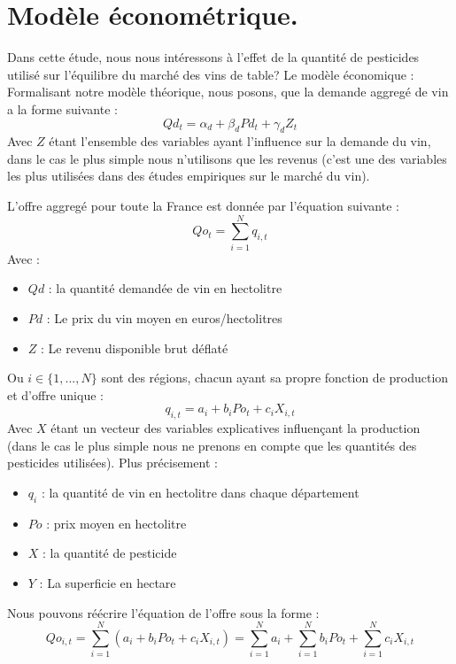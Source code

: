 \documentclass[11pt, a4paper]{article}
\begin{document}
\section*{Modèle économétrique.}
Dans cette étude, nous nous intéressons à l’effet de la quantité de pesticides utilisé sur l’équilibre du marché des vins de table?
Le modèle économique :
Formalisant notre modèle théorique, nous posons, que la demande aggregé de vin a la forme suivante :
\begin{equation}
    Qd_t = \alpha_d + \beta_d Pd_t + \gamma_d Z_t
\end{equation}
Avec $Z$ étant l'ensemble des variables ayant l'influence sur la demande du vin, dans le cas le plus simple nous n'utilisons que les revenus (c'est une des variables les plus utilisées dans des études empiriques sur le marché du vin).
\par
L'offre aggregé pour toute la France est donnée par l'équation suivante : 
\begin{equation}
    Qo_t = \sum_{i = 1}^{N} q_{i,t}
\end{equation}
Avec :
\begin{itemize}
  \item $Qd$ : la quantité demandée de vin en hectolitre
  \item $Pd$ : Le prix du vin moyen en euros/hectolitres
  \item $Z$ : Le revenu disponible brut déflaté
\end{itemize}
Ou $i \in \{1, ..., N\}$ sont des régions, chacun ayant sa propre fonction de production et d'offre unique : 
\begin{equation}
    q_{i,t} = a_i + b_i Po_t + c_i X_{i,t}
\end{equation}
Avec $X$ étant un vecteur des variables explicatives influençant la production (dans le cas le plus simple nous ne prenons en compte que les quantités des pesticides utilisées).
Plus précisement :
\begin{itemize}
  \item $q_i$ : la quantité de vin en hectolitre dans chaque département
  \item $Po$ : prix moyen en hectolitre
  \item $X$ : la quantité de pesticide
  \item $Y$ : La superficie en hectare
\end{itemize}
Nous pouvons réécrire l'équation de l'offre sous la forme :
\begin{equation}
    Qo_{i,t} = \sum_{i = 1}^{N} (a_i + b_i Po_{t} + c_i X_{i,t}) = \sum_{i = 1}^{N} a_i + \sum_{i = 1}^{N} b_i Po_{t} + \sum_{i = 1}^{N} c_i X_{i,t}
\end{equation}
\end{document}
